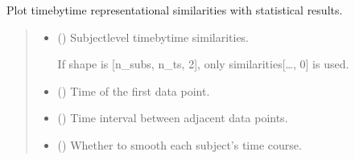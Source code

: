\documentclass[letterpaper,10pt,english]{sphinxhowto}
\begin{document}
\begin{fulllineitems}
\pysigstopsignatures
\sphinxAtStartPar
Plot time\sphinxhyphen{}by\sphinxhyphen{}time representational similarities with statistical results.
\begin{quote}\begin{description}
\begin{itemize}
\item {} 
\sphinxAtStartPar
{} (\sphinxstyleliteralemphasis{\sphinxupquote{, }}\sphinxstyleliteralemphasis{\sphinxupquote{ {[}}}\sphinxstyleliteralemphasis{\sphinxupquote{, }}\sphinxstyleliteralemphasis{\sphinxupquote{{]} or }}\sphinxstyleliteralemphasis{\sphinxupquote{{[}}}\sphinxstyleliteralemphasis{\sphinxupquote{, }}\sphinxstyleliteralemphasis{\sphinxupquote{, }}\sphinxstyleliteralemphasis{\sphinxupquote{{]}}}) \textendash{} 
\sphinxAtStartPar
Subject\sphinxhyphen{}level time\sphinxhyphen{}by\sphinxhyphen{}time similarities.

\sphinxAtStartPar
If shape is {[}n\_subs, n\_ts, 2{]}, only similarities{[}…, 0{]} is used.


\item {} 
\sphinxAtStartPar
{} (\sphinxstyleliteralemphasis{\sphinxupquote{, }}) \textendash{} Time of the first data point.

\item {} 
\sphinxAtStartPar
{} (\sphinxstyleliteralemphasis{\sphinxupquote{, }}) \textendash{} Time interval between adjacent data points.

\item {} 
\sphinxAtStartPar
{} (\sphinxstyleliteralemphasis{\sphinxupquote{, }}) \textendash{} Whether to smooth each subject’s time course.


\end{itemize}
\end{description}
\end{quote}
\end{fulllineitems}
\end{document}
